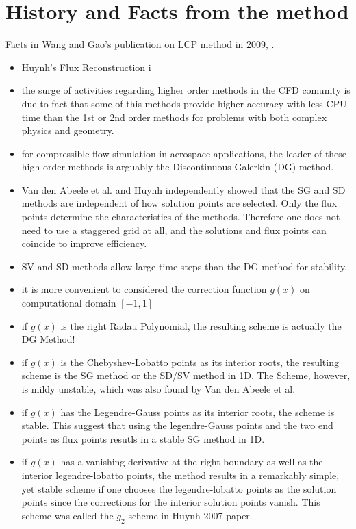 \section*{History and Facts from the method}

\begin{frame}[allowframebreaks]
 Facts in Wang and Gao's publication on LCP method in 2009, \cite{Wang&Gao2009}.
 \begin{itemize}
  \item Huynh's Flux Reconstruction i
  \item the surge of activities regarding higher order methods in the CFD comunity is due to fact that some of this methods provide higher accuracy with less CPU time than the 1st or 2nd order methods for problems with both complex physics and geometry.
  \item for compressible flow simulation in aerospace applications, the leader of these high-order methods is arguably the Discontinuous Galerkin (DG) method.
  \item Van den Abeele et al. and Huynh independently showed that the SG and SD methods are independent of how solution points are selected. Only the flux points determine the characteristics of the methods. Therefore one does not need to use a staggered grid at all, and the solutions and flux points can coincide to improve efficiency.
  \item SV and SD methods allow large time steps than the DG method for stability.
  \item it is more convenient to considered the correction function $g(x)$ on computational domain $[-1,1]$
  \item if $g(x)$ is the right Radau Polynomial, the resulting scheme is actually the DG Method!
  \item if $g(x)$ is the Chebyshev-Lobatto points as its interior roots, the resulting scheme is the SG method or the SD/SV method in 1D. The Scheme, however, is mildy unstable, which was also found by Van den Abeele et al.
  \item if $g(x)$ has the Legendre-Gauss points as its interior roots, the scheme is stable. This suggest that using the legendre-Gauss points and the two end points as flux points resutls in a stable SG method in 1D.
  \item if $g(x)$ has a vanishing derivative at the right boundary as well as the interior legendre-lobatto points, the method results in a remarkably simple, yet stable scheme if one chooses the legendre-lobatto points as the solution points since the corrections for the interior solution points vanish. This scheme was called the $g_2$ scheme in Huynh 2007 paper. 
 \end{itemize}
\end{frame}

